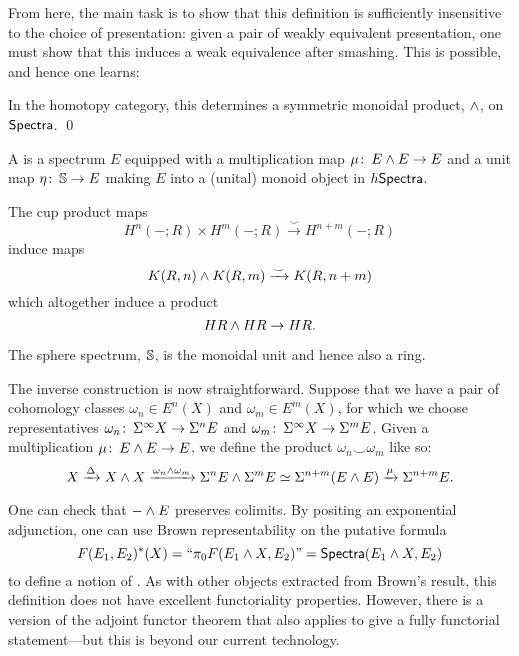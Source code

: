 From here, the main task is to show that this definition is sufficiently insensitive to the choice of presentation: given a pair of weakly equivalent presentation, one must show that this induces a weak equivalence after smashing.
This is possible, and hence one learns:

\begin{theorem}
In the homotopy category, this determines a symmetric monoidal product, $\sm$, on $\CatOf{Spectra}$. \qed
\end{theorem}

\begin{definition}
A  is a spectrum $E$ equipped with a multiplication map $\mu\co E \sm E \to E$ and a unit map $\eta\co \S \to E$ making $E$ into a (unital) monoid object in $h\CatOf{Spectra}$.
\end{definition}

\begin{example}
The cup product maps \[H^n(-; R) \times H^m(-; R) \xrightarrow\smile H^{n+m}(-; R)\] induce maps \[K(R, n) \sm K(R, m) \xrightarrow\smile K(R, n+m)\] which altogether induce a product \[HR \sm HR \to HR.\]
\end{example}

\begin{example}
The sphere spectrum, $\S$, is the monoidal unit and hence also a ring.
\end{example}

The inverse construction is now straightforward.
Suppose that we have a pair of cohomology classes $\omega_n \in E^n(X)$ and $\omega_m \in E^m(X)$, for which we choose representatives $\omega_n\co \Susp^\infty X \to \Susp^n E$ and $\omega_m\co \Susp^\infty X \to \Susp^m E$.
Given a multiplication $\mu\co E \sm E \to E$, we define the product $\omega_n \smile \omega_m$ like so:
\[X \xrightarrow{\Delta} X \sm X \xrightarrow{\omega_n \sm \omega_m} \Susp^n E \sm \Susp^m E \simeq \Susp^{n+m}(E \sm E) \xrightarrow\mu \Susp^{n+m} E.\]

\begin{remark}
One can check that $- \sm E$ preserves colimits.
By positing an exponential adjunction, one can use Brown representability on the putative formula \[F(E_1, E_2)^*(X) = \text{``}\pi_0 F(E_1 \sm X, E_2)\text{''} = \CatOf{Spectra}(E_1 \sm X, E_2)\] to define a notion of .
As with other objects extracted from Brown's result, this definition does not have excellent functoriality properties.
However, there is a version of the adjoint functor theorem that also applies to give a fully functorial statement---but this is beyond our current technology.
\end{remark}

